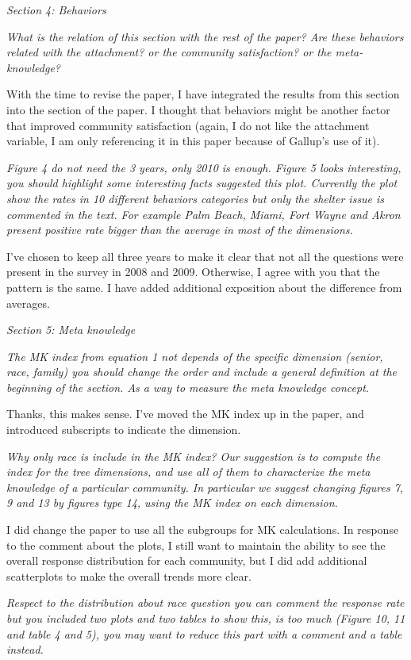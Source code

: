 \documentclass[12pt]{article}
\begin{document}
\emph{Section 4: Behaviors}

\emph{What is the relation of this section with the rest of the paper? Are these behaviors related with the attachment? or the community satisfaction? or the meta-knowledge?}

With the time to revise the paper, I have integrated the results from this section into the section of the paper. I thought that behaviors might be another factor that improved community satisfaction (again, I do not like the attachment variable, I am only referencing it in this paper because of Gallup's use of it). 

\emph{Figure 4 do not need the 3 years, only 2010 is enough. Figure 5 looks interesting, you should highlight some interesting facts suggested this plot. Currently the plot show the rates in 10 different behaviors categories but only the shelter issue is commented in the text. For example Palm Beach, Miami, Fort Wayne and Akron present positive rate bigger than the average in most of the dimensions.}

I've chosen to keep all three years to make it clear that not all the questions were present in the survey in 2008 and 2009. Otherwise, I agree with you that the pattern is the same. I have added additional exposition about the difference from averages. 

\emph{Section 5: Meta knowledge}

\emph{The MK index from equation 1 not depends of the specific dimension (senior, race, family) you should change the order and include a general definition at the beginning of the section. As a way to measure the meta knowledge concept.}

Thanks, this makes sense. I've moved the MK index up in the paper, and introduced subscripts to indicate the dimension. 

\emph{Why only race is include in the MK index?  Our suggestion is to compute the index for the tree dimensions, and use all of them to characterize the meta knowledge of a particular community.  In particular we suggest changing figures 7, 9 and 13 by figures type 14, using the MK index on each dimension.}

I did change the paper to use all the subgroups for MK calculations. In response to the comment about the plots, I still want to maintain the ability to see the overall response distribution for each community, but I did add additional scatterplots to make the overall trends more clear. 

\emph{Respect to the distribution about race question you can comment the response rate but you included two plots and two tables to show this, is too much (Figure 10, 11 and table 4 and 5), you may want to reduce this part with a comment and a table instead.}
\end{document}
